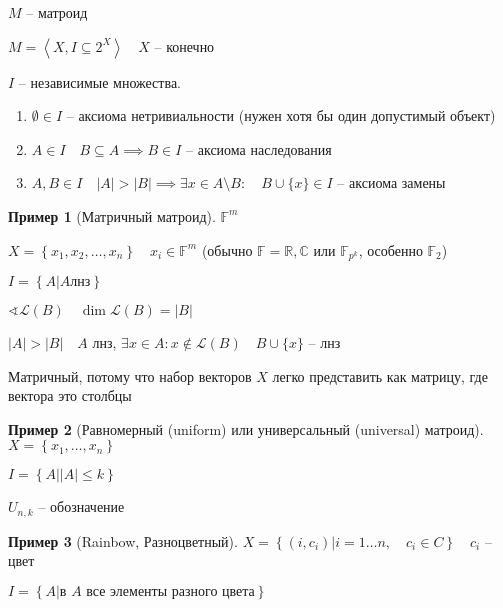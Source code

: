 \documentclass{book}
\newcommand\R{\ensuremath{\mathbb{R}}}
\renewcommand\O{\ensuremath{\emptyset}}
\renewcommand\C{\ensuremath{\mathbb{C}}}
\theoremstyle{definition}
\newtheorem*{example}{Пример}
\begin{document}
\begin{definition}
    $M$ -- матроид

     $M = \left<X, I\subseteq 2^X \right>\quad X$ -- конечно

     $I$ -- независимые множества.
      \begin{enumerate}
          \item $\O \in I$ -- аксиома нетривиальности (нужен хотя бы один допустимый объект)
         \item $A\in I\quad B\subseteq A \implies B\in I$ -- аксиома наследования
         \item $A, B\in I\quad |A| > |B| \implies \exists x\in A\setminus B:\quad B\cup \{x\} \in I$ -- аксиома замены
     \end{enumerate}
\end{definition}

\begin{example}
    [Матричный матроид]

    $\mathbb F^m$

    $X = \left\{ x_1, x_2, \ldots, x_{n}  \right\}\quad x_i\in \mathbb F^m $ (обычно $\mathbb F = \R, \C$ или $\mathbb F_{p^k}$, особенно  $\mathbb F_2$)

    $I = \left\{ A | A \text{лнз} \right\} $

    $\sphericalangle \mathscr L\left( B \right) \quad \dim \mathscr L\left( B \right)  = |B|$

    $|A| > |B|\quad A$ лнз,  $\exists x\in A: x\not\in \mathscr L\left( B \right) \quad B\cup \{x\}$ -- лнз

    Матричный, потому что набор векторов $X$ легко представить как матрицу, где вектора это столбцы
\end{example}

\begin{example}
    [Равномерный (uniform) или универсальный (universal) матроид]

    $X = \left\{ x_1, \ldots, x_{n}  \right\} $

    $I = \left\{ A| \left| A \right| \leqslant k \right\} $

    $U_{n,k}$ -- обозначение
\end{example}
\begin{example}
    [Rainbow, Разноцветный]

    $X = \left\{ \left( i, c_i \right) | i = 1 \ldots n, \quad c_i\in C \right\} \quad c_i$ -- цвет

    $I = \left\{ A | \text{в } A \text{ все элементы разного цвета} \right\} $ 


\end{example}
\end{document}
